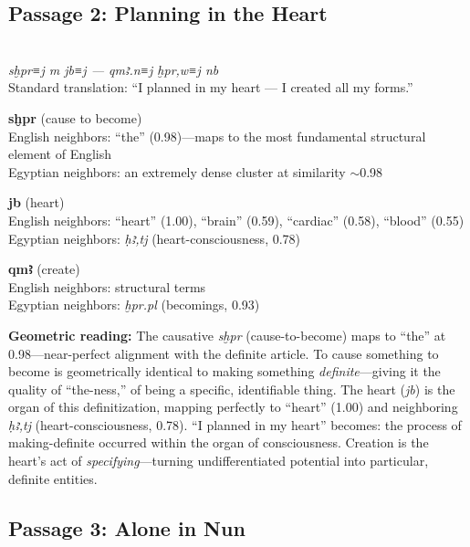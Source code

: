\documentclass[11pt, a4paper]{article}
\newcommand{\passagehiero}[1]{{\normalfont\hierofont\fontsize{14}{17}\selectfont #1}}
\begin{document}
\subsection{Passage 2: Planning in the Heart}

{\color{passage}\passagehiero{𓋴𓆣𓂋𓇋 𓅓 𓄣𓏤𓇋 --- 𓌙𓅓𓄿𓈖𓇋 𓆣𓂋𓅱𓏥𓇋 𓎟}\\\medskip
\textit{\small sḫpr≡j m jb≡j --- qmꜣ.n≡j ḫpr,w≡j nb}\\
Standard translation: ``I planned in my heart --- I created all my forms.''}

\bigskip

\noindent\textbf{sḫpr} (cause to become)\\
English neighbors: ``the'' (0.98)---maps to the most fundamental structural element of English\\
Egyptian neighbors: an extremely dense cluster at similarity $\sim$0.98

\medskip

\noindent\textbf{jb} (heart)\\
English neighbors: ``heart'' (1.00), ``brain'' (0.59), ``cardiac'' (0.58), ``blood'' (0.55)\\
Egyptian neighbors: \textit{ḥꜣ,tj} (heart-consciousness, 0.78)

\medskip

\noindent\textbf{qmꜣ} (create)\\
English neighbors: structural terms\\
Egyptian neighbors: \textit{ḫpr.pl} (becomings, 0.93)

\medskip

{\color{insight}\textbf{Geometric reading:}} The causative \textit{sḫpr} (cause-to-become) maps to ``the'' at 0.98---near-perfect alignment with the definite article. To cause something to become is geometrically identical to making something \textit{definite}---giving it the quality of ``the-ness,'' of being a specific, identifiable thing. The heart (\textit{jb}) is the organ of this definitization, mapping perfectly to ``heart'' (1.00) and neighboring \textit{ḥꜣ,tj} (heart-consciousness, 0.78). ``I planned in my heart'' becomes: the process of making-definite occurred within the organ of consciousness. Creation is the heart's act of \textit{specifying}---turning undifferentiated potential into particular, definite entities.

\subsection{Passage 3: Alone in Nun}
\end{document}
